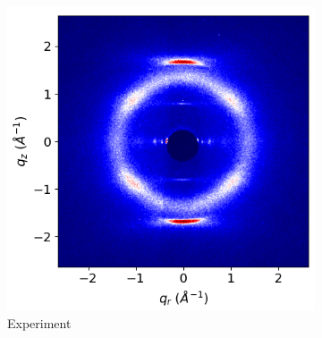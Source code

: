 \documentclass{article}
\begin{document}
\begin{figure}
\begin{subfigure}{0.33\textwidth}
                \centering
                \includegraphics[width=\textwidth]{WAXS_raw.png}
                \caption{Experiment}\label{fig:xrd_exp}
        \end{subfigure}
	\caption{}\label{fig:xrd}
\end{figure}
\end{document}
